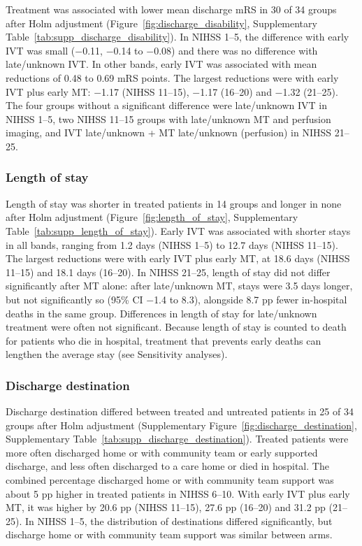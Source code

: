Treatment was associated with lower mean discharge mRS in 30 of 34 groups after Holm adjustment (Figure~\ref{fig:discharge_disability}, Supplementary Table~\ref{tab:supp_discharge_disability}). In NIHSS 1--5, the difference with early IVT was small ($-$0.11, $-$0.14 to $-$0.08) and there was no difference with late/unknown IVT. In other bands, early IVT was associated with mean reductions of 0.48 to 0.69 mRS points. The largest reductions were with early IVT plus early MT: $-$1.17 (NIHSS 11--15), $-$1.17 (16--20) and $-$1.32 (21--25). The four groups without a significant difference were late/unknown IVT in NIHSS 1--5, two NIHSS 11--15 groups with late/unknown MT and perfusion imaging, and IVT late/unknown + MT late/unknown (perfusion) in NIHSS 21--25.

\subsubsection*{Length of stay}

Length of stay was shorter in treated patients in 14 groups and longer in none after Holm adjustment (Figure~\ref{fig:length_of_stay}, Supplementary Table~\ref{tab:supp_length_of_stay}). Early IVT was associated with shorter stays in all bands, ranging from 1.2 days (NIHSS 1--5) to 12.7 days (NIHSS 11--15). The largest reductions were with early IVT plus early MT, at 18.6 days (NIHSS 11--15) and 18.1 days (16--20). In NIHSS 21--25, length of stay did not differ significantly after MT alone: after late/unknown MT, stays were 3.5 days longer, but not significantly so (95\% CI $-$1.4 to 8.3), alongside 8.7 pp fewer in-hospital deaths in the same group. Differences in length of stay for late/unknown treatment were often not significant. Because length of stay is counted to death for patients who die in hospital, treatment that prevents early deaths can lengthen the average stay (see Sensitivity analyses).

\subsubsection*{Discharge destination}

Discharge destination differed between treated and untreated patients in 25 of 34 groups after Holm adjustment (Supplementary Figure~\ref{fig:discharge_destination}, Supplementary Table~\ref{tab:supp_discharge_destination}). Treated patients were more often discharged home or with community team or early supported discharge, and less often discharged to a care home or died in hospital. The combined percentage discharged home or with community team support was about 5 pp higher in treated patients in NIHSS 6--10. With early IVT plus early MT, it was higher by 20.6 pp (NIHSS 11--15), 27.6 pp (16--20) and 31.2 pp (21--25). In NIHSS 1--5, the distribution of destinations differed significantly, but discharge home or with community team support was similar between arms.


